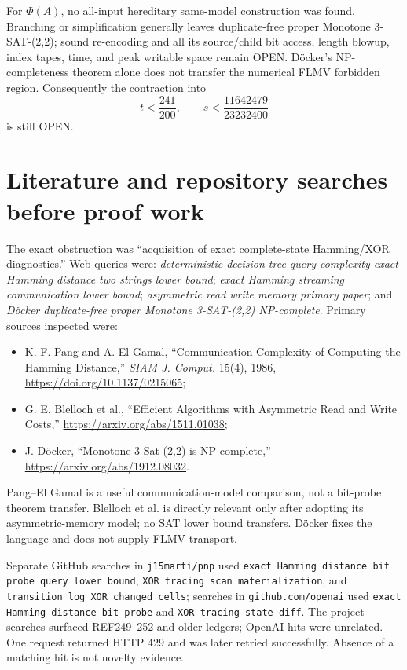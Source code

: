 \documentclass[11pt]{article}
\newcommand{\status}[1]{\textsf{#1}}
\begin{document}
For $\Phi(A)$, no all-input hereditary same-model construction was found.  Branching or simplification generally leaves duplicate-free proper Monotone 3-SAT-(2,2); sound re-encoding and all its source/child bit access, length blowup, index tapes, time, and peak writable space remain \status{OPEN}.  Döcker's NP-completeness theorem alone does not transfer the numerical FLMV forbidden region.  Consequently the contraction into
\[
 t<\frac{241}{200},\qquad s<\frac{11642479}{23232400}
\]
is still \status{OPEN}.

\section{Literature and repository searches before proof work}
The exact obstruction was ``acquisition of exact complete-state Hamming/XOR diagnostics.''  Web queries were: \emph{deterministic decision tree query complexity exact Hamming distance two strings lower bound}; \emph{exact Hamming streaming communication lower bound}; \emph{asymmetric read write memory primary paper}; and \emph{Döcker duplicate-free proper Monotone 3-SAT-(2,2) NP-complete}.  Primary sources inspected were:
\begin{itemize}
\item K. F. Pang and A. El Gamal, ``Communication Complexity of Computing the Hamming Distance,'' \emph{SIAM J. Comput.} 15(4), 1986, \url{https://doi.org/10.1137/0215065};
\item G. E. Blelloch et al., ``Efficient Algorithms with Asymmetric Read and Write Costs,'' \url{https://arxiv.org/abs/1511.01038};
\item J. D\"ocker, ``Monotone 3-Sat-(2,2) is NP-complete,'' \url{https://arxiv.org/abs/1912.08032}.
\end{itemize}
Pang--El Gamal is a useful communication-model comparison, not a bit-probe theorem transfer.  Blelloch et al. is directly relevant only after adopting its asymmetric-memory model; no SAT lower bound transfers.  Döcker fixes the language and does not supply FLMV transport.

Separate GitHub searches in \texttt{j15marti/pnp} used \texttt{exact Hamming distance bit probe query lower bound}, \texttt{XOR tracing scan materialization}, and \texttt{transition log XOR changed cells}; searches in \texttt{github.com/openai} used \texttt{exact Hamming distance bit probe} and \texttt{XOR tracing state diff}.  The project searches surfaced REF249--252 and older ledgers; OpenAI hits were unrelated.  One request returned HTTP 429 and was later retried successfully.  Absence of a matching hit is not novelty evidence.
\end{document}
